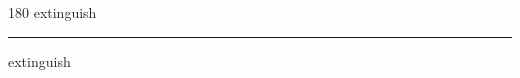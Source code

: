 
\begin{frame}
\begin{center}
\begin{turn}{180}
{\fontsize{2.5cm}{1em}\selectfont extinguish}
\end{turn}
\vspace{1em}\par  
\hrule
\vspace{1em}\par  
{\fontsize{2.5cm}{1em}\selectfont extinguish}
\end{center}
\end{frame}
